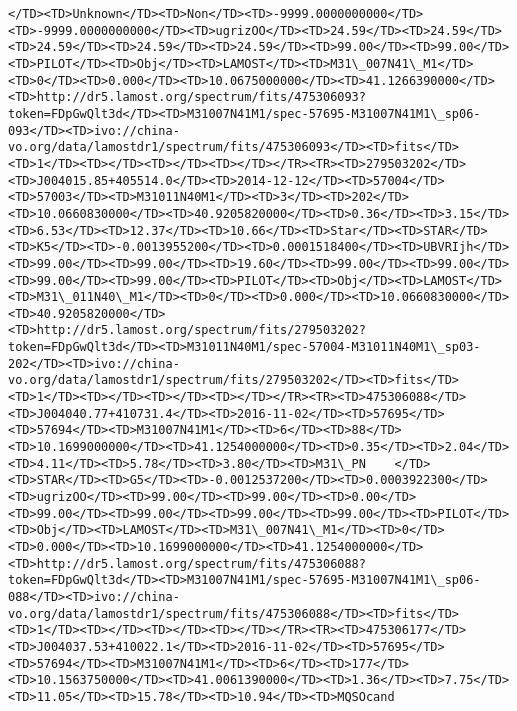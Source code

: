 \documentclass[11pt]{article}
\begin{document}
\begin{Verbatim}[commandchars=\\\{\}]
</TD><TD>Unknown</TD><TD>Non</TD><TD>-9999.0000000000</TD><TD>-9999.0000000000</TD><TD>ugrizOO</TD><TD>24.59</TD><TD>24.59</TD><TD>24.59</TD><TD>24.59</TD><TD>24.59</TD><TD>99.00</TD><TD>99.00</TD><TD>PILOT</TD><TD>Obj</TD><TD>LAMOST</TD><TD>M31\_007N41\_M1</TD><TD>0</TD><TD>0.000</TD><TD>10.0675000000</TD><TD>41.1266390000</TD><TD>http://dr5.lamost.org/spectrum/fits/475306093?token=FDpGwQlt3d</TD><TD>M31007N41M1/spec-57695-M31007N41M1\_sp06-093</TD><TD>ivo://china-vo.org/data/lamostdr1/spectrum/fits/475306093</TD><TD>fits</TD><TD>1</TD><TD></TD><TD></TD><TD></TD></TR><TR><TD>279503202</TD><TD>J004015.85+405514.0</TD><TD>2014-12-12</TD><TD>57004</TD><TD>57003</TD><TD>M31011N40M1</TD><TD>3</TD><TD>202</TD><TD>10.0660830000</TD><TD>40.9205820000</TD><TD>0.36</TD><TD>3.15</TD><TD>6.53</TD><TD>12.37</TD><TD>10.66</TD><TD>Star</TD><TD>STAR</TD><TD>K5</TD><TD>-0.0013955200</TD><TD>0.0001518400</TD><TD>UBVRIjh</TD><TD>99.00</TD><TD>99.00</TD><TD>19.60</TD><TD>99.00</TD><TD>99.00</TD><TD>99.00</TD><TD>99.00</TD><TD>PILOT</TD><TD>Obj</TD><TD>LAMOST</TD><TD>M31\_011N40\_M1</TD><TD>0</TD><TD>0.000</TD><TD>10.0660830000</TD><TD>40.9205820000</TD><TD>http://dr5.lamost.org/spectrum/fits/279503202?token=FDpGwQlt3d</TD><TD>M31011N40M1/spec-57004-M31011N40M1\_sp03-202</TD><TD>ivo://china-vo.org/data/lamostdr1/spectrum/fits/279503202</TD><TD>fits</TD><TD>1</TD><TD></TD><TD></TD><TD></TD></TR><TR><TD>475306088</TD><TD>J004040.77+410731.4</TD><TD>2016-11-02</TD><TD>57695</TD><TD>57694</TD><TD>M31007N41M1</TD><TD>6</TD><TD>88</TD><TD>10.1699000000</TD><TD>41.1254000000</TD><TD>0.35</TD><TD>2.04</TD><TD>4.11</TD><TD>5.78</TD><TD>3.80</TD><TD>M31\_PN    </TD><TD>STAR</TD><TD>G5</TD><TD>-0.0012537200</TD><TD>0.0003922300</TD><TD>ugrizOO</TD><TD>99.00</TD><TD>99.00</TD><TD>0.00</TD><TD>99.00</TD><TD>99.00</TD><TD>99.00</TD><TD>99.00</TD><TD>PILOT</TD><TD>Obj</TD><TD>LAMOST</TD><TD>M31\_007N41\_M1</TD><TD>0</TD><TD>0.000</TD><TD>10.1699000000</TD><TD>41.1254000000</TD><TD>http://dr5.lamost.org/spectrum/fits/475306088?token=FDpGwQlt3d</TD><TD>M31007N41M1/spec-57695-M31007N41M1\_sp06-088</TD><TD>ivo://china-vo.org/data/lamostdr1/spectrum/fits/475306088</TD><TD>fits</TD><TD>1</TD><TD></TD><TD></TD><TD></TD></TR><TR><TD>475306177</TD><TD>J004037.53+410022.1</TD><TD>2016-11-02</TD><TD>57695</TD><TD>57694</TD><TD>M31007N41M1</TD><TD>6</TD><TD>177</TD><TD>10.1563750000</TD><TD>41.0061390000</TD><TD>1.36</TD><TD>7.75</TD><TD>11.05</TD><TD>15.78</TD><TD>10.94</TD><TD>MQSOcand  
\end{Verbatim}
\end{document}
